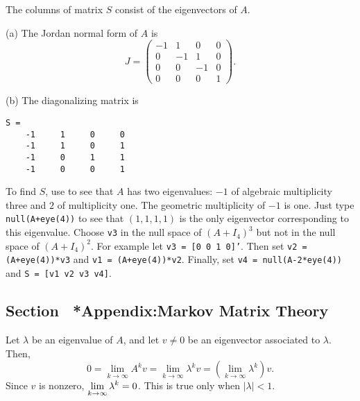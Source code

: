 \soln The columns of matrix $S$ consist of the eigenvectors of $A$.

(a) \ans The Jordan normal form of $A$ is
\[
J = \left(\begin{array}{rrrr}
-1 &  1 &  0 & 0 \\
0  & -1 &  1 & 0 \\
0  &  0 & -1 & 0 \\
0  &  0 &  0 & 1 \end{array}\right).
\]

(b) \ans  The diagonalizing matrix is
\begin{verbatim}
S =
    -1     1     0     0
    -1     1     0     1
    -1     0     1     1
    -1     0     0     1
\end{verbatim}

\soln To find $S$, use \Matlab to see that $A$ has two eigenvalues: $-1$ of
algebraic multiplicity three and $2$ of multiplicity one.  The geometric 
multiplicity of $-1$ is one.  Just type {\tt null(A+eye(4))} to see that 
$(1,1,1,1)$ is the only eigenvector corresponding to this eigenvalue.  Choose 
{\tt v3} in the null space of $(A+I_4)^3$ but not in the null space of 
$(A+I_4)^2$.  For example let {\tt v3 = [0 0 1 0]'}.  Then set 
{\tt v2 = (A+eye(4))*v3} and {\tt v1 = (A+eye(4))*v2}.  Finally, set 
{\tt v4 = null(A-2*eye(4))} and {\tt S = [v1 v2 v3 v4]}.



\subsection*{Section~\protect{\ref{S:TransitionTheory}} *Appendix:Markov Matrix
Theory}

Let $\lambda$ be an eigenvalue of $A$, and let $v \neq 0$ be an eigenvector
associated to $\lambda$.  Then,
\[
0 = \lim_{k \to \infty}A^kv = \lim_{k \to \infty}\lambda^kv
= \left(\lim_{k \to \infty}\lambda^k\right)v.
\]
Since $v$ is nonzero,
$\displaystyle \lim_{k \to \infty}\lambda^k = 0$.  This is true only when
$|\lambda| < 1$.



 
